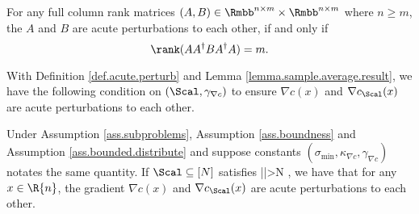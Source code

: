   \begin{definition}
	\label{def.acute.perturb}
	For any full column rank matrices $(A,B)\in\Rmbb^{n\times m}\times\Rmbb^{n\times m}$ where $n\ge m$, the $A$ and $B$ are acute perturbations to each other, if and only if
	\[
	\rank(AA^\dag BA^\dag A)=m.
	\]
\end{definition}



With Definition \ref{def.acute.perturb} and Lemma \ref{lemma.sample.average.result}, we have the following condition on $(\Scal,\gamma_{\nabla c})$ to ensure $\nabla c(x)$ and $\nabla c_{\Scal}(x)$ are acute perturbations to each other.

\begin{lemma}
\label{lemma.acute.perturb}
	Under Assumption \ref{ass.subproblems}, Assumption \ref{ass.boundness} and Assumption \ref{ass.bounded.distribute} and suppose constants $(\sigma_{\min},\kappa_{\nabla c},\gamma_{\nabla c})$ notates the same quantity. If $\Scal\subseteq[N]$ satisfies 
	\bequation\label{ineq.acute.perturb}
	|\Scal|>N ,
	\eequation
	we have that for any $x\in\R{n}$, the gradient $\nabla c(x)$ and $\nabla c_{\Scal}(x)$ are acute perturbations to each other.	
\end{lemma}

